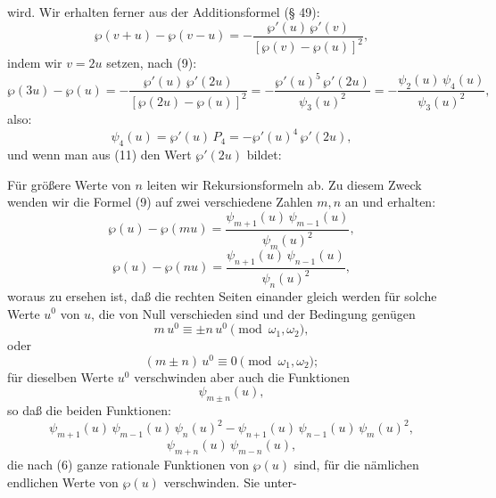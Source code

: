 
wird. Wir erhalten ferner aus der Additionsformel (§ 49):
\[
\wp(v+u) - \wp(v-u) = -\frac{\wp'(u)\,\wp'(v)}{\left[\wp(v)-\wp(u)\right]^2},
\]
indem wir $v=2u$ setzen, nach (9):
\[
\wp(3u) - \wp(u) = -\frac{\wp'(u)\,\wp'(2u)}{\left[\wp(2u)-\wp(u)\right]^2}
= -\frac{\wp'(u)^5\,\wp'(2u)}{\psi_3(u)^2} = -\frac{\psi_2(u)\,\psi_4(u)}{\psi_3(u)^2},
\]
also:
\[
\psi_4(u) = \wp'(u)\,P_4 = -\wp'(u)^4\,\wp'(2u),
\]
und wenn man aus (11) den Wert $\wp'(2u)$ bildet:

Für größere Werte von $n$ leiten wir Rekursionsformeln ab. Zu diesem Zweck
wenden wir die Formel (9) auf zwei verschiedene Zahlen $m, n$ an und
erhalten:
\[
\wp(u) - \wp(mu) = \frac{\psi_{m+1}(u)\,\psi_{m-1}(u)}{\psi_m(u)^2},
\]
\[
\wp(u) - \wp(nu) = \frac{\psi_{n+1}(u)\,\psi_{n-1}(u)}{\psi_n(u)^2},
\]
woraus zu ersehen ist, daß die rechten Seiten einander gleich werden für
solche Werte $u^0$ von $u$, die von Null verschieden sind und der
Bedingung genügen
\[
m\,u^0 \equiv \pm n\,u^0 \pmod{\omega_1,\omega_2},
\]
oder
\[
(m\pm n)\,u^0 \equiv 0 \pmod{\omega_1,\omega_2};
\]
für dieselben Werte $u^0$ verschwinden aber auch die Funktionen
\[
\psi_{m\pm n}(u),
\]
so daß die beiden Funktionen:
\[
\psi_{m+1}(u)\,\psi_{m-1}(u)\,\psi_n(u)^2 - \psi_{n+1}(u)\,\psi_{n-1}(u)\,\psi_m(u)^2,
\]
\[
\psi_{m+n}(u)\,\psi_{m-n}(u),
\]
die nach (6) ganze rationale Funktionen von $\wp(u)$ sind, für die
nämlichen endlichen Werte von $\wp(u)$ verschwinden. Sie unter-
